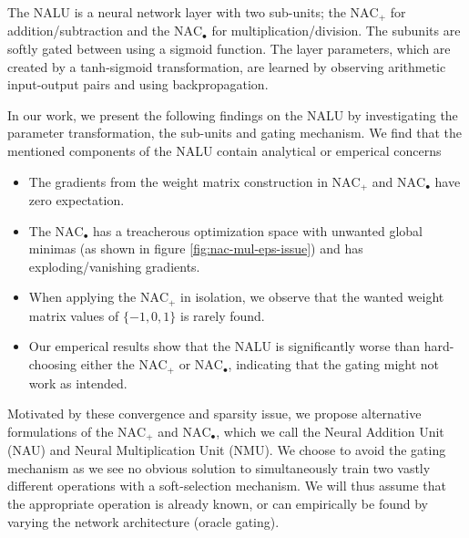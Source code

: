 The NALU is a neural network layer with two sub-units; the $\text{NAC}_{+}$ for addition/subtraction and the $\text{NAC}_{\bullet}$ for multiplication/division.
The subunits are softly gated between using a sigmoid function. The layer parameters, which are created by a tanh-sigmoid transformation, are learned by observing arithmetic input-output pairs and using backpropagation\cite{rumelhart1986learning}.

In our work, we present the following findings on the NALU by investigating the parameter transformation, the sub-units and gating mechanism.
We find that the mentioned components of the NALU contain analytical or emperical concerns
\begin{itemize}
\item The gradients from the weight matrix construction in $\text{NAC}_{+}$ and $\text{NAC}_{\bullet}$ have zero expectation.

\item The $\text{NAC}_{\bullet}$ has a treacherous optimization space with unwanted global minimas (as shown in figure \ref{fig:nac-mul-eps-issue}) and has exploding/vanishing gradients.

\item When applying the $\text{NAC}_{+}$ in isolation, we observe that the wanted weight matrix values of $\{-1, 0, 1\}$ is rarely found.

\item Our emperical results show that the NALU is significantly worse than hard-choosing either the $\text{NAC}_{+}$ or $\text{NAC}_{\bullet}$, indicating that the gating might not work as intended.
\end{itemize}
Motivated by these convergence and sparsity issue, we propose alternative formulations of the $\text{NAC}_{+}$ and $\text{NAC}_{\bullet}$, which we call the Neural Addition Unit (NAU) and Neural Multiplication Unit (NMU).
We choose to avoid the gating mechanism as we see no obvious solution to simultaneously train two vastly different operations with a soft-selection mechanism.
We will thus assume that the appropriate operation is already known, or can empirically be found by varying the network architecture (oracle gating).


